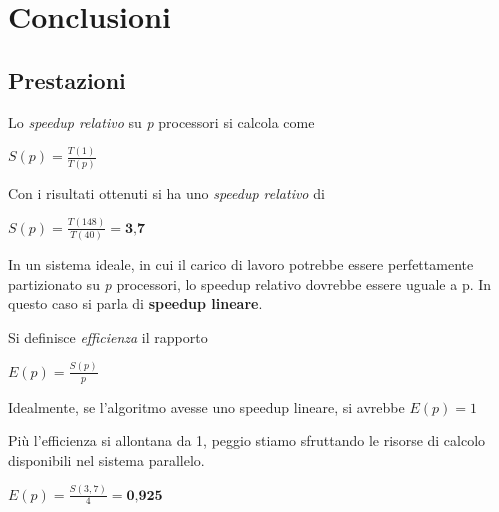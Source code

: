 \documentclass[11pt,a4paper,twoside,openright]{book}
\begin{document}
\chapter{Conclusioni}
\section{Prestazioni}

Lo \textit{speedup relativo} su \textit{p} processori si calcola come

\begin{center}
\begin{math}
S(p) = \frac{T(1)}{T(p)}
\end{math}
\end{center}

Con i risultati ottenuti si ha uno \textit{speedup relativo} di

\begin{center}
\begin{math}
S(p) = \frac{T(148)}{T(40)} = \textbf{3,7}
\end{math}
\end{center}

In un sistema ideale, in cui il carico di lavoro potrebbe essere perfettamente partizionato su \textit{p} processori, lo speedup relativo dovrebbe essere uguale a p. In questo caso si parla di \textbf{speedup lineare}.

Si definisce \textit{efficienza} il rapporto
\begin{center}
\begin{math}
E(p) = \frac{S(p)}{p}
\end{math}
\end{center}

Idealmente, se l'algoritmo avesse uno speedup lineare, si avrebbe 
\begin{math}
E(p) = 1
\end{math}

Più l'efficienza si allontana da 1, peggio stiamo sfruttando le risorse di calcolo disponibili nel sistema parallelo.
\begin{center}
\begin{math}
				E(p) = \frac{S(3,7)}{4} = \textbf{0,925}
\end{math}
\end{center}
\end{document}
